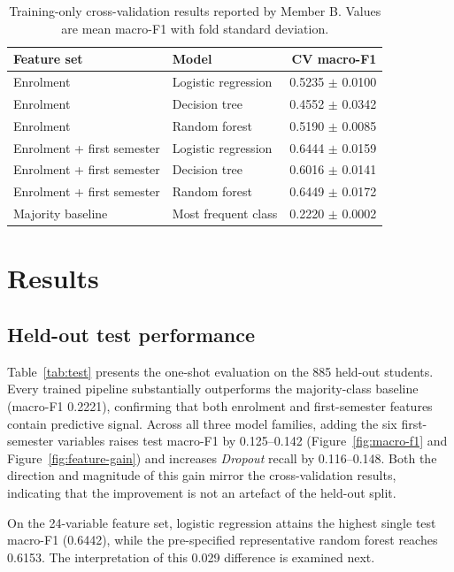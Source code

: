 \documentclass[11pt,a4paper]{article}
\newcommand{\Dropout}{\textit{Dropout}}
\begin{document}
\begin{table}[H]
\centering
\caption{Training-only cross-validation results reported by Member B. Values are mean macro-F1
with fold standard deviation.}
\label{tab:cv}
\begin{tabular}{llr}
\toprule
Feature set & Model & CV macro-F1 \\
\midrule
Enrolment & Logistic regression & 0.5235 $\pm$ 0.0100 \\
Enrolment & Decision tree & 0.4552 $\pm$ 0.0342 \\
Enrolment & Random forest & 0.5190 $\pm$ 0.0085 \\
Enrolment + first semester & Logistic regression & 0.6444 $\pm$ 0.0159 \\
Enrolment + first semester & Decision tree & 0.6016 $\pm$ 0.0141 \\
Enrolment + first semester & Random forest & 0.6449 $\pm$ 0.0172 \\
Majority baseline & Most frequent class & 0.2220 $\pm$ 0.0002 \\
\bottomrule
\end{tabular}
\end{table}

\section{Results}

\subsection{Held-out test performance}

Table~\ref{tab:test} presents the one-shot evaluation on the 885 held-out students. Every trained
pipeline substantially outperforms the majority-class baseline (macro-F1 0.2221), confirming that
both enrolment and first-semester features contain predictive signal. Across all three model
families, adding the six first-semester variables raises test macro-F1 by 0.125--0.142
(Figure~\ref{fig:macro-f1} and Figure~\ref{fig:feature-gain}) and increases \Dropout{} recall by
0.116--0.148. Both the direction and magnitude of this gain mirror the cross-validation results,
indicating that the improvement is not an artefact of the held-out split.

On the 24-variable feature set, logistic regression attains the highest single test macro-F1
(0.6442), while the pre-specified representative random forest reaches 0.6153. The interpretation of
this 0.029 difference is examined next.
\end{document}
